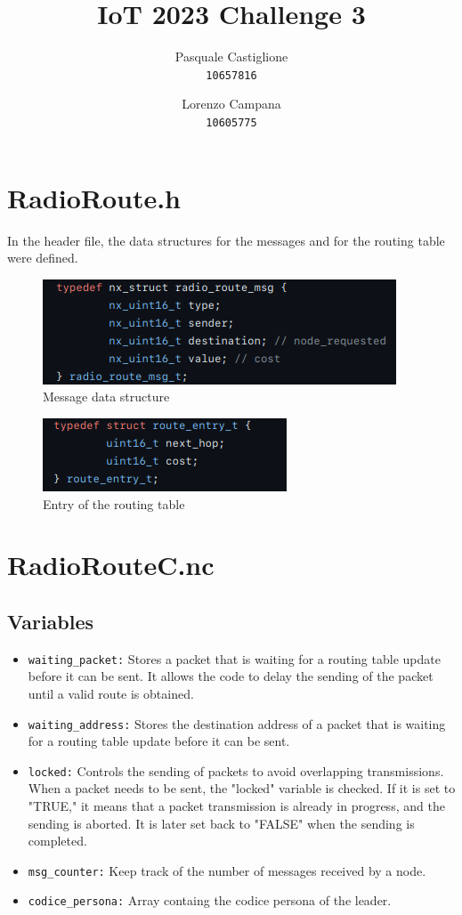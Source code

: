 \documentclass[11pt]{article}
\title{\textbf{IoT 2023 Challenge 3}}
\author{
  Pasquale Castiglione\\
	\texttt{10657816}
  \and
  Lorenzo Campana\\
  \texttt{10605775}
}
\date{}
\begin{document}
\maketitle

\section*{RadioRoute.h}
In the header file, the data structures for the messages and for the routing table were defined.
\begin{figure}[h]
\includegraphics[scale=0.5]{msg.png}
\caption{Message data structure}
\end{figure}
\begin{figure}[h]
\includegraphics[scale=0.5]{entry.png}
\caption{Entry of the routing table}
\end{figure}

\section*{RadioRouteC.nc}
\subsection*{Variables} 
\begin{itemize}
	\item{\texttt{waiting\_packet:}} Stores a packet that is waiting for a routing table update before it can be sent. It allows the code to delay the sending of the packet until a valid route is obtained.
	\item{\texttt{waiting\_address:}} Stores the destination address of a packet that is waiting for a routing table update before it can be sent.
	\item{\texttt{locked:}} Controls the sending of packets to avoid overlapping transmissions. When a packet needs to be sent, the "locked" variable is checked. If it is set to "TRUE," it means that a packet transmission is already in progress, and the sending is aborted. It is later set back to "FALSE" when the sending is completed.
	\item{\texttt{msg\_counter:}} Keep track of the number of messages received by a node.
	\item{\texttt{codice\_persona:}} Array containg the codice persona of the leader.

\end{itemize}
\end{document}
